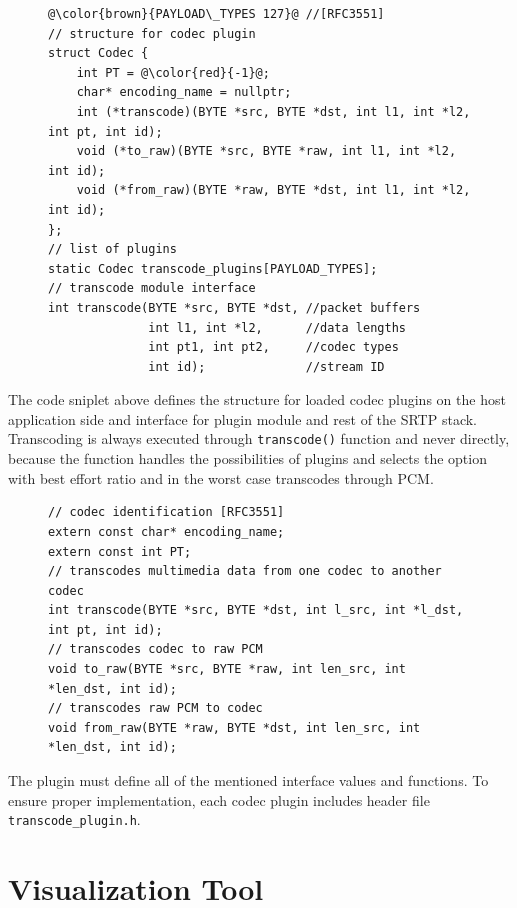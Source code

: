 \begin{figure}[H]
\begin{lstlisting}
@\color{brown}{PAYLOAD\_TYPES 127}@ //[RFC3551]
// structure for codec plugin
struct Codec {
    int PT = @\color{red}{-1}@;
    char* encoding_name = nullptr;
    int (*transcode)(BYTE *src, BYTE *dst, int l1, int *l2, int pt, int id);
    void (*to_raw)(BYTE *src, BYTE *raw, int l1, int *l2, int id);
    void (*from_raw)(BYTE *raw, BYTE *dst, int l1, int *l2, int id);
};
// list of plugins
static Codec transcode_plugins[PAYLOAD_TYPES];
// transcode module interface
int transcode(BYTE *src, BYTE *dst, //packet buffers 
              int l1, int *l2,      //data lengths
              int pt1, int pt2,     //codec types
              int id);              //stream ID
\end{lstlisting}
\end{figure}

The code sniplet above defines the structure for loaded codec plugins on the 
host application side and interface for plugin module and rest of the SRTP 
stack. Transcoding is always executed through \texttt{transcode()} function and
never directly, because the function handles the possibilities of plugins
and selects the option with best effort ratio and in the worst case transcodes
through PCM.

\begin{figure}[H]
\begin{lstlisting}
// codec identification [RFC3551]
extern const char* encoding_name;
extern const int PT;
// transcodes multimedia data from one codec to another codec
int transcode(BYTE *src, BYTE *dst, int l_src, int *l_dst, int pt, int id);
// transcodes codec to raw PCM
void to_raw(BYTE *src, BYTE *raw, int len_src, int *len_dst, int id);
// transcodes raw PCM to codec
void from_raw(BYTE *raw, BYTE *dst, int len_src, int *len_dst, int id);
\end{lstlisting}
\end{figure}

The plugin must define all of the mentioned interface values and functions.
To ensure proper implementation, each codec plugin includes header file 
\texttt{transcode\_plugin.h}.


\section{Visualization Tool}






